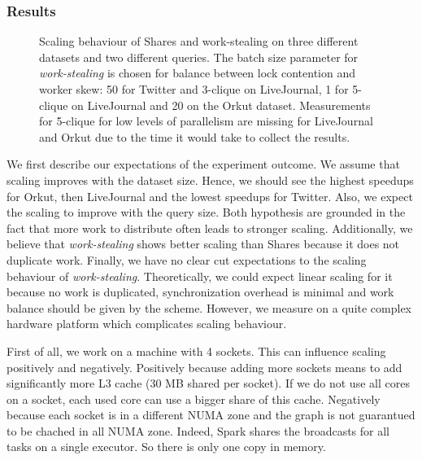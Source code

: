 \subsubsection{Results}

\begin{figure}
    \centering
    \newline
    \caption{Scaling behaviour of Shares and work-stealing on three different datasets
      and two different queries.
      The batch size parameter for \textit{work-stealing} is chosen for balance between lock contention and worker skew:
      50 for Twitter and 3-clique on LiveJournal, 1 for 5-clique on LiveJournal and 20 on the Orkut dataset.
      Measurements for 5-clique for low levels of parallelism are missing for LiveJournal and Orkut due to the time it would take
      to collect the results.
    }
    \label{fig:graphWCOJ-scaling}
\end{figure}

We first describe our expectations of the experiment outcome.
We assume that scaling improves with the dataset size.
Hence, we should see the highest speedups for Orkut, then LiveJournal and the lowest speedups for Twitter.
Also, we expect the scaling to improve with the query size.
Both hypothesis are grounded in the fact that more work to distribute often leads to stronger scaling.
Additionally, we believe that \textit{work-stealing} shows better scaling than Shares because it does not duplicate work.
Finally, we have no clear cut expectations to the scaling behaviour of \textit{work-stealing}.
Theoretically, we could expect linear scaling for it because no work is duplicated, synchronization overhead is minimal and
work balance should be given by the scheme.
However, we measure on a quite complex hardware platform which complicates scaling behaviour.

First of all, we work on a machine with 4 sockets.
This can influence scaling positively and negatively.
Positively because adding more sockets means to add significantly more L3 cache (30 MB shared per socket).
If we do not use all cores on a socket, each used core can use a bigger share of this cache.
Negatively because each socket is in a different NUMA zone and the graph is not guarantued to be chached in all
NUMA zone.
Indeed, Spark shares the broadcasts for all tasks on a single executor.
So there is only one copy in memory. %


